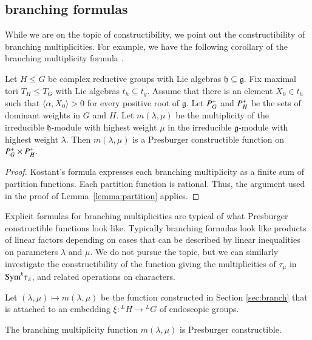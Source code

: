 \subsection{branching formulas}

While we are on the topic of constructibility, we point out the
constructibility of branching multiplicities.  For example, we have
the following corollary of the branching multiplicity formula
\cite[Theorem ~8.2.1]{goodman}.

\begin{lemma} 
  Let $H\le G$ be complex reductive groups with Lie algebras
  ${\mathfrak h}\subseteq {\mathfrak g}$.  Fix maximal tori $T_H\le
  T_G$ with Lie algebras $t_h\subseteq t_g$.  Assume that there is an
  element $X_0\in t_h$ such that $\langle\alpha,X_0\rangle>0$ for
  every positive root of ${\mathfrak g}$.  Let $P^+_G$ and $P^+_H$
  be the sets of dominant weights in $G$ and $H$.  Let
  $m(\lambda,\mu)$ be the multiplicity of the irreducible $\mathfrak
  h$-module with highest weight $\mu$ in the irreducible $\mathfrak
  g$-module with highest weight $\lambda$.  Then $m(\lambda,\mu)$ is a
  Presburger constructible function on $P^+_G\times P^+_H$.
\end{lemma}

\begin{proof}  
  Kostant's formula expresses each branching multiplicity as a finite
  sum of partition functions.  Each partition function is rational.
  Thus, the argument used in the proof of Lemma~\ref{lemma:partition}
  applies.
\end{proof}

Explicit formulas for branching multiplicities are typical of what
Presburger constructible functions look like.  Typically branching
formulas look like products of linear factors depending on cases that
can be described by linear inequalities on parameters $\lambda$ and
$\mu$.  We do not pursue the topic, but we can similarly investigate
the constructibility of the function giving the multiplicities of
$\tau_\mu$ in ${\operatorname{Sym}}^k \tau_\lambda$, and related operations on
characters.

\bigskip 

Let $(\lambda,\mu)\mapsto m(\lambda,\mu)$ be the function constructed
in Section \ref{sec:branch} that is attached to an embedding
$\xi:{}^LH\to {}^LG$ of endoscopic groups.

\begin{lemma}\label{lemma:branch} 
  The branching multiplicity function $m(\lambda,\mu)$ is Presburger
  constructible.
\end{lemma}

